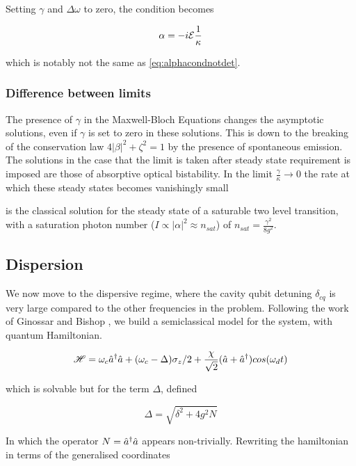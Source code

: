 Setting $\gamma$ and $\Delta\omega$ to zero, the condition becomes

\begin{equation}
  \alpha = -i\mathcal{E}\frac{1}{\kappa}
\end{equation}

which is notably not the same as \cref{eq:alphacondnotdet}.

\subsubsection{Difference between limits}\cite{Alsing1990}
  The presence of $\gamma$ in the Maxwell-Bloch Equations changes the asymptotic solutions, even if $\gamma$ is set to zero in these solutions. This is down to the breaking of the conservation law $4|\beta|^2 +\zeta^2 = 1$ by the presence of spontaneous emission. The solutions in the case that the limit is taken after steady state requirement is imposed are those of absorptive optical bistability. In the limit $\frac{\gamma}{\kappa} \rightarrow 0$ the rate at which these steady states becomes vanishingly small

 is the classical solution for the steady state of a saturable two level transition, with a saturation photon number ($I \propto |\alpha|^2 \approx n_{sat}$) of $n_{sat} = \frac{\gamma^2}{8g^2}$.

\subsection{Dispersion}
We now move to the dispersive regime, where the cavity qubit detuning $\delta_{cq}$ is very large compared to the other frequencies in the problem. Following the work of Ginossar and Bishop \cite{Bishop2010}, we build a semiclassical model for the system, with quantum Hamiltonian.

\begin{equation}
\mathscr{H} = \omega_c \hat{a}^\dagger \hat{a} + ( \omega_c - \Delta ) \sigma_z /2 + \frac{\chi}{\sqrt{2}} (\hat{a} + \hat{a}^\dagger ) cos(\omega_d t)
\end{equation}

which is solvable but for the term $\Delta$, defined

\begin{equation}
        \Delta = \sqrt{\delta^2 +4 g ^2 N}
\end{equation}

In which the operator $N = \hat{a}^\dagger \hat{a} $ appears non-trivially. Rewriting the hamiltonian in terms of the generalised coordinates

